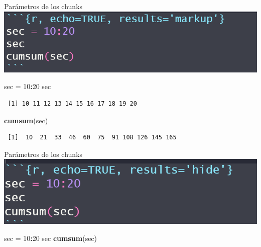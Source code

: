 \documentclass[
  ignorenonframetext,
]{beamer}
\newenvironment{Shaded}{\begin{snugshade}}{\end{snugshade}}
\newcommand{\DecValTok}[1]{\textcolor[rgb]{0.00,0.00,0.81}{#1}}
\newcommand{\FunctionTok}[1]{\textcolor[rgb]{0.13,0.29,0.53}{\textbf{#1}}}
\newcommand{\NormalTok}[1]{#1}
\newcommand{\OtherTok}[1]{\textcolor[rgb]{0.56,0.35,0.01}{#1}}
\newcommand{\SpecialCharTok}[1]{\textcolor[rgb]{0.81,0.36,0.00}{\textbf{#1}}}
\begin{document}
\begin{frame}[fragile]{Parámetros de los chunks}
\label{paruxe1metros-de-los-chunks-7}
\includegraphics[width=0.6\linewidth]{Imgs/para_chunks_03}

\begin{Shaded}
\begin{Highlighting}[]
\NormalTok{sec }\OtherTok{=} \DecValTok{10}\SpecialCharTok{:}\DecValTok{20}
\NormalTok{sec}
\end{Highlighting}
\end{Shaded}

\begin{verbatim}
 [1] 10 11 12 13 14 15 16 17 18 19 20
\end{verbatim}

\begin{Shaded}
\begin{Highlighting}[]
\FunctionTok{cumsum}\NormalTok{(sec)}
\end{Highlighting}
\end{Shaded}

\begin{verbatim}
 [1]  10  21  33  46  60  75  91 108 126 145 165
\end{verbatim}
\end{frame}

\begin{frame}[fragile]{Parámetros de los chunks}
\label{paruxe1metros-de-los-chunks-8}
\includegraphics[width=0.6\linewidth]{Imgs/parametros_chunk_4}

\begin{Shaded}
\begin{Highlighting}[]
\NormalTok{sec }\OtherTok{=} \DecValTok{10}\SpecialCharTok{:}\DecValTok{20}
\NormalTok{sec}
\FunctionTok{cumsum}\NormalTok{(sec)}
\end{Highlighting}
\end{Shaded}
\end{frame}
\end{document}
